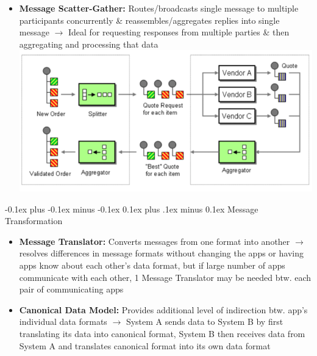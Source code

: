 \documentclass[landscape]{article}
\makeatletter
\renewcommand{\subsection}{\@startsection{subsection}{2}{0mm}%
  {-0.1ex plus -0.1ex minus -0.1ex}%
  {0.1ex plus .1ex minus 0.1ex}%
{\normalfont\scriptsize\bfseries}}
\makeatother
\begin{document}
\begin{multicols*}{5}
\begin{itemize}
      \item \textbf{Message Scatter-Gather:} Routes/broadcasts single message to multiple participants concurrently \& reassembles/aggregates replies into single message $\rightarrow$ Ideal for requesting responses from multiple parties \& then aggregating and processing that data
      \includegraphics[width=0.85\linewidth]{10_splitter_agg_sg.png}
    \end{itemize}

    \subsection{Message Transformation}
    \begin{itemize}
      \item \textbf{Message Translator:} Converts messages from one format into another $\rightarrow$ resolves differences in message formats without changing the apps or having apps know about each other's data format, but if large number of apps communicate with each other, 1 Message Translator may be needed btw. each pair of communicating apps
      \item \textbf{Canonical Data Model:} Provides additional level of indirection btw. app's individual data formats $\rightarrow$ System A sends data to System B by first translating its data into canonical format, System B then receives data from System A and translates canonical format into its own data format
    \end{itemize}


\end{multicols*}
\end{document}
